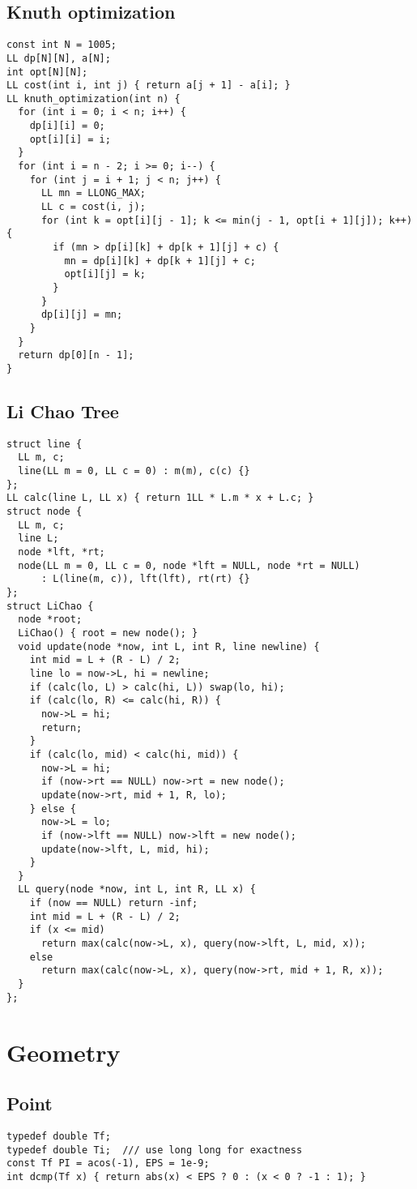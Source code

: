 \documentclass[FSZ,a4paper,onesided]{article}
\begin{document}
\begin{multicols*}{\COLS}
\subsection{Knuth optimization}
\begin{lstlisting}
const int N = 1005;
LL dp[N][N], a[N];
int opt[N][N];
LL cost(int i, int j) { return a[j + 1] - a[i]; }
LL knuth_optimization(int n) {
  for (int i = 0; i < n; i++) {
    dp[i][i] = 0;
    opt[i][i] = i;
  }
  for (int i = n - 2; i >= 0; i--) {
    for (int j = i + 1; j < n; j++) {
      LL mn = LLONG_MAX;
      LL c = cost(i, j);
      for (int k = opt[i][j - 1]; k <= min(j - 1, opt[i + 1][j]); k++) {
        if (mn > dp[i][k] + dp[k + 1][j] + c) {
          mn = dp[i][k] + dp[k + 1][j] + c;
          opt[i][j] = k;
        }
      }
      dp[i][j] = mn;
    }
  }
  return dp[0][n - 1];
}
\end{lstlisting}
\subsection{Li Chao Tree}
\begin{lstlisting}
struct line {
  LL m, c;
  line(LL m = 0, LL c = 0) : m(m), c(c) {}
};
LL calc(line L, LL x) { return 1LL * L.m * x + L.c; }
struct node {
  LL m, c;
  line L;
  node *lft, *rt;
  node(LL m = 0, LL c = 0, node *lft = NULL, node *rt = NULL)
      : L(line(m, c)), lft(lft), rt(rt) {}
};
struct LiChao {
  node *root;
  LiChao() { root = new node(); }
  void update(node *now, int L, int R, line newline) {
    int mid = L + (R - L) / 2;
    line lo = now->L, hi = newline;
    if (calc(lo, L) > calc(hi, L)) swap(lo, hi);
    if (calc(lo, R) <= calc(hi, R)) {
      now->L = hi;
      return;
    }
    if (calc(lo, mid) < calc(hi, mid)) {
      now->L = hi;
      if (now->rt == NULL) now->rt = new node();
      update(now->rt, mid + 1, R, lo);
    } else {
      now->L = lo;
      if (now->lft == NULL) now->lft = new node();
      update(now->lft, L, mid, hi);
    }
  }
  LL query(node *now, int L, int R, LL x) {
    if (now == NULL) return -inf;
    int mid = L + (R - L) / 2;
    if (x <= mid)
      return max(calc(now->L, x), query(now->lft, L, mid, x));
    else
      return max(calc(now->L, x), query(now->rt, mid + 1, R, x));
  }
};
\end{lstlisting}
\section{Geometry}
\subsection{Point}
\begin{lstlisting}
typedef double Tf;
typedef double Ti;  /// use long long for exactness
const Tf PI = acos(-1), EPS = 1e-9;
int dcmp(Tf x) { return abs(x) < EPS ? 0 : (x < 0 ? -1 : 1); }


\end{lstlisting}
\end{multicols*}
\end{document}
